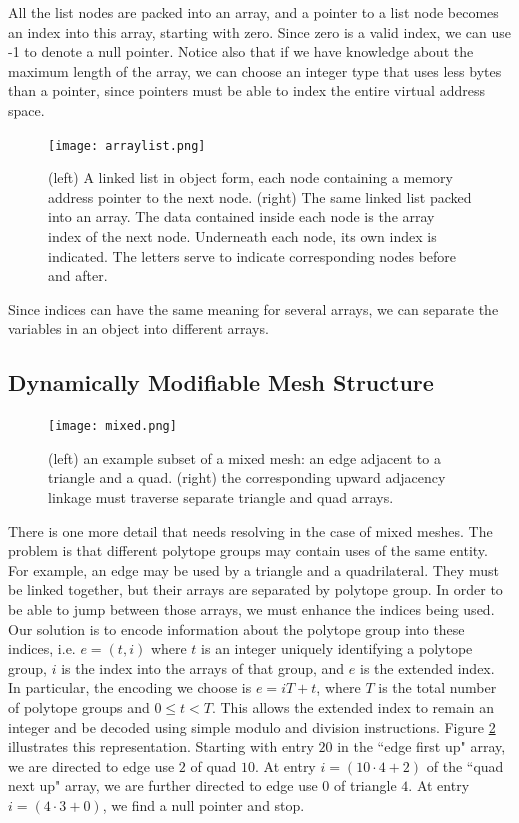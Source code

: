 All the list nodes are packed into an array, and a pointer to
a list node becomes an index into this array, starting with zero.
Since zero is a valid index, we can use -1 to denote a null pointer.
Notice also that if we have knowledge about the maximum length
of the array, we can choose an integer type that uses less bytes
than a pointer, since pointers must be able to index the entire
virtual address space.

\begin{figure}
\begin{center}
\texttt{[image: arraylist.png]}
\caption{(left) A linked list in object form, each node containing
a memory address pointer to the next node.
(right) The same linked list packed into an array.
The data contained inside each node is the array index of the next node.
Underneath each node, its own index is indicated.
The letters serve to indicate corresponding nodes before and after.}
\label{fig:arraylist}
\end{center}
\end{figure}

Since indices can have the same meaning for several arrays,
we can separate the variables in an object into different
arrays.

\subsection{Dynamically Modifiable Mesh Structure}
\label{sec:sisc_mstruct}

\begin{figure}
\begin{center}
\texttt{[image: mixed.png]}
\caption{(left) an example subset of a mixed mesh:
an edge adjacent to a triangle and a quad.
(right) the corresponding upward adjacency linkage
must traverse separate triangle and quad arrays.}
\label{fig:mixed}
\end{center}
\end{figure}

There is one more detail that needs resolving in the
case of mixed meshes.
The problem is that different polytope
groups may contain uses of the same entity.
For example, an edge may be used by a triangle and a quadrilateral.
They must be linked together, but their arrays are
separated by polytope group.
In order to be able to jump between those arrays, we must
enhance the indices being used.
Our solution is to encode information about the polytope group
into these indices, i.e. $e = (t,i)$ where $t$ is an integer
uniquely identifying a polytope group, $i$ is the index
into the arrays of that group, and $e$ is the extended index.
In particular, the encoding we choose is $e = iT + t$, where
$T$ is the total number of polytope groups and $0\leq t < T$.
This allows the extended index to remain an integer
and be decoded using simple modulo and division instructions.
Figure \ref{fig:mixed} illustrates this representation.
Starting with entry $20$ in the ``edge first up" array,
we are directed to edge use $2$ of quad $10$.
At entry $i=(10\cdot 4 + 2)$ of the ``quad next up" array,
we are further directed to edge use $0$ of triangle $4$.
At entry $i=(4\cdot 3 + 0)$, we find a null pointer and stop.

